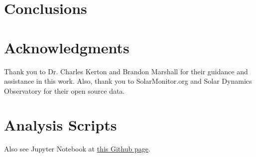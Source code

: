 \documentclass[%
aip,
jmp,
reprint,
floatfix,
]{revtex4-1}
\begin{document}

	\section{Conclusions}
	



	\section*{Acknowledgments}

	Thank you to Dr. Charles Kerton and Brandon Marshall for their guidance and assistance in this work. Also, thank you to SolarMonitor.org and Solar Dynamics Observatory for their open source data.



	\onecolumngrid
	\appendix

	\section{Analysis Scripts} \label{sec:scripts}
	Also see Jupyter Notebook at \href{https://github.com/mileslucas/astro344l/blob/master/lab7/src/lab7.ipynb}{this Github page}.
	
	
	
\end{document}
